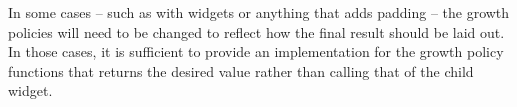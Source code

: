 In some cases -- such as with  widgets or anything that
adds padding -- the growth policies will need to be changed to reflect
how the final result should be laid out.  In those cases, it is
sufficient to provide an implementation for the growth policy
functions that returns the desired value rather than calling that of
the child widget.
